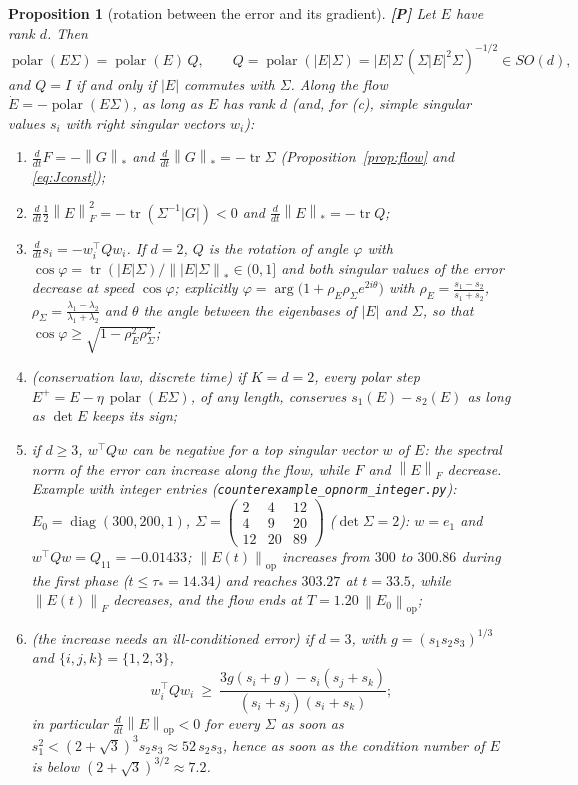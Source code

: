 \documentclass[11pt]{article}
\newtheorem{proposition}[theorem]{Proposition}
\theoremstyle{definition}
\theoremstyle{remark}
\newcommand{\nop}[1]{\left\|#1\right\|_{\mathrm{op}}}
\newcommand{\nnuc}[1]{\left\|#1\right\|_{*}}
\newcommand{\nF}[1]{\left\|#1\right\|_{F}}
\newcommand{\abs}[1]{\left|#1\right|}
\newcommand{\tr}{\operatorname{tr}}
\newcommand{\diag}{\operatorname{diag}}
\newcommand{\polar}{\operatorname{polar}}
\begin{document}
\begin{proposition}[rotation between the error and its gradient]\label{prop:Q} \textbf{[P]}
Let $E$ have rank $d$. Then
\[
\polar(E\Sigma)=\polar(E)\,Q,\qquad Q=\polar(\abs E\Sigma)=\abs E\Sigma\,(\Sigma\abs E^2\Sigma)^{-1/2}\in SO(d),
\]
and $Q=I$ if and only if $\abs E$ commutes with $\Sigma$. Along the flow $\dot E=-\polar(E\Sigma)$, as long as $E$ has
rank $d$ (and, for (c), simple singular values $s_i$ with right singular vectors $w_i$):
\begin{enumerate}[label=(\alph*)]
\item $\frac d{dt}F=-\nnuc G$ and $\frac d{dt}\nnuc G=-\tr\Sigma$ (Proposition~\ref{prop:flow} and \eqref{eq:Jconst});
\item $\frac d{dt}\frac12\nF E^2=-\tr(\Sigma^{-1}\abs G)<0$ and $\frac d{dt}\nnuc E=-\tr Q$;
\item $\frac d{dt}s_i=-w_i^\top Qw_i$. If $d=2$, $Q$ is the rotation of angle $\varphi$ with
$\cos\varphi=\tr(\abs E\Sigma)/\nnuc{\abs E\Sigma}\in(0,1]$ and both singular values of the error decrease at speed
$\cos\varphi$; explicitly $\varphi=\arg\big(1+\rho_E\rho_\Sigma e^{2i\theta}\big)$ with
$\rho_E=\frac{s_1-s_2}{s_1+s_2}$, $\rho_\Sigma=\frac{\lambda_1-\lambda_2}{\lambda_1+\lambda_2}$ and $\theta$ the angle
between the eigenbases of $\abs E$ and $\Sigma$, so that $\cos\varphi\ge\sqrt{1-\rho_E^2\rho_\Sigma^2}$;
\item (conservation law, discrete time) if $K=d=2$, every polar step $E^+=E-\eta\,\polar(E\Sigma)$, of any length,
conserves $s_1(E)-s_2(E)$ as long as $\det E$ keeps its sign;
\item if $d\ge3$, $w^\top Qw$ can be negative for a top singular vector $w$ of $E$: \emph{the spectral norm of the error
can increase along the flow}, while $F$ and $\nF E$ decrease. Example with integer entries
(\texttt{counterexample\_opnorm\_integer.py}): $E_0=\diag(300,200,1)$,
$\Sigma=\left(\begin{smallmatrix}2&4&12\\4&9&20\\12&20&89\end{smallmatrix}\right)$ ($\det\Sigma=2$): $w=e_1$ and
$w^\top Qw=Q_{11}=-0.01433$; $\nop{E(t)}$ increases from $300$ to $300.86$ during the first phase
($t\le\tau_\ast=14.34$) and reaches $303.27$ at $t=33.5$, while $\nF{E(t)}$ decreases, and the flow ends at
$T=1.20\,\nop{E_0}$;
\item (the increase needs an ill-conditioned error) if $d=3$, with $g=(s_1s_2s_3)^{1/3}$ and $\{i,j,k\}=\{1,2,3\}$,
\[
w_i^\top Qw_i\ \ge\ \frac{3g(s_i+g)-s_i(s_j+s_k)}{(s_i+s_j)(s_i+s_k)} ;
\]
in particular $\frac d{dt}\nop E<0$ for every $\Sigma$ as soon as $s_1^2<(2+\sqrt3)^3s_2s_3\approx52\,s_2s_3$, hence as
soon as the condition number of $E$ is below $(2+\sqrt3)^{3/2}\approx7.2$.
\end{enumerate}
\end{proposition}
\end{document}
